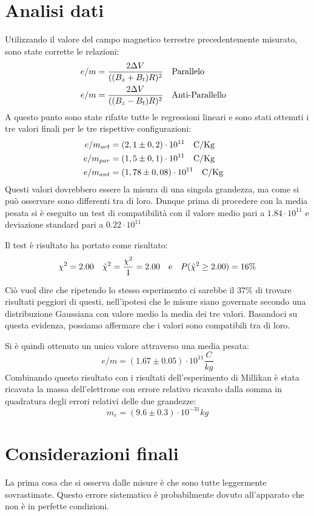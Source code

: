 \documentclass{article}
\begin{document}
\section{Analisi dati}
    Utilizzando il valore del campo magnetico terrestre precedentemente misurato, sono state corrette le relazioni:
    \begin{align*}
        e/m&= \frac{2\Delta V}{((B_z+B_t)R)^2}  \qq{Parallelo}\\
        e/m &= \frac{2\Delta V}{((B_z-B_t)R)^2} \qq{Anti-Parallello}
    \end{align*}
    A questo punto sono state rifatte tutte le regressioni lineari e sono stati ottenuti i tre valori finali per le tre rispettive configurazioni:
        \begin{align*}
            e/m_{ort}&=(2,1 \pm 0,2) \cdot 10^{11} \qq{C/Kg} \\
            e/m_{par} &= (1,5 \pm 0,1) \cdot 10^{11} \qq{C/Kg} \\
            e/m_{ant} &= (1,78 \pm 0,08) \cdot 10^{11} \qq{C/Kg}
        \end{align*}
    Questi valori dovrebbero essere la misura di una singola grandezza, ma come si può osservare sono differenti tra di loro. Dunque prima di procedere con la media pesata si è eseguito un test di compatibilità con il valore medio pari a $1.84\cdot10^{11}$ e deviazione standard pari a $0.22\cdot10^{11}$

    Il test è risultato ha portato come risultato:
    \[\chi^2 = 2.00 \quad \Tilde{\chi}^2= \frac{\chi^2}{1} = 2.00 \qq{e} P(\Tilde{\chi}^2 \ge 2.00) = 16\% \]

    Ciò vuol dire che ripetendo lo stesso esperimento ci sarebbe il $37\%$ di trovare risultati peggiori di questi, nell'ipotesi che le misure siano governate secondo una distribuzione Gaussiana con valore medio la media dei tre valori. Basandoci su questa evidenza, possiamo affermare che i valori sono compatibili tra di loro.
    
    Si è quindi ottenuto un unico valore attraverso una media pesata:
    \[e/m= (1.67\pm0.05) \cdot 10^{11}\frac{C}{kg}\]
    Combinando questo risultato con i risultati dell'esperimento di Millikan è stata ricavata la massa dell'elettrone con errore relativo ricavato dalla somma in quadratura degli errori relativi delle due grandezze:
    \[m_e=(9.6 \pm 0.3) \cdot 10^{-31}kg\]
    
\section{Considerazioni finali}
    La prima cosa che si osserva dalle misure è che sono tutte leggermente sovrastimate. Questo errore sistematico è probabilmente dovuto all'apparato che non è in perfette condizioni. 
\end{document}
